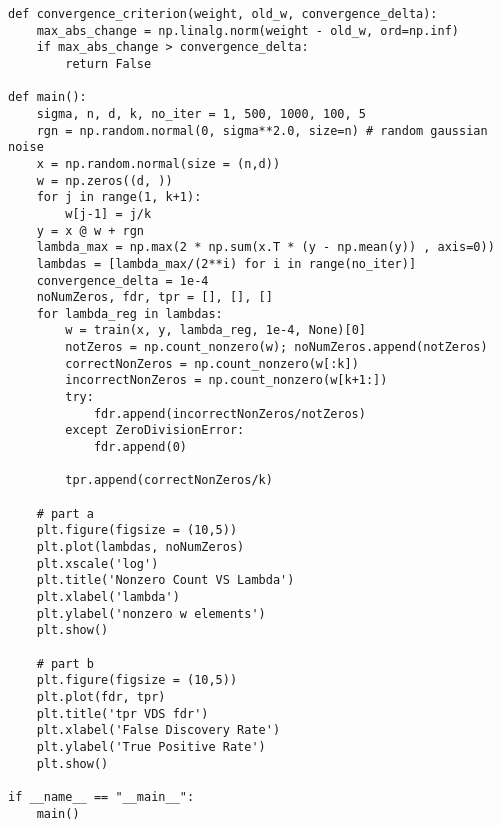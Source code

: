 \documentclass{article}
\begin{document}
\begin{aprob}
\begin{enumerate}
\begin{lstlisting}
def convergence_criterion(weight, old_w, convergence_delta):
    max_abs_change = np.linalg.norm(weight - old_w, ord=np.inf)
    if max_abs_change > convergence_delta:
        return False

def main():
    sigma, n, d, k, no_iter = 1, 500, 1000, 100, 5
    rgn = np.random.normal(0, sigma**2.0, size=n) # random gaussian noise
    x = np.random.normal(size = (n,d))
    w = np.zeros((d, ))
    for j in range(1, k+1): 
        w[j-1] = j/k
    y = x @ w + rgn
    lambda_max = np.max(2 * np.sum(x.T * (y - np.mean(y)) , axis=0))
    lambdas = [lambda_max/(2**i) for i in range(no_iter)]
    convergence_delta = 1e-4
    noNumZeros, fdr, tpr = [], [], []
    for lambda_reg in lambdas:
        w = train(x, y, lambda_reg, 1e-4, None)[0]
        notZeros = np.count_nonzero(w); noNumZeros.append(notZeros)
        correctNonZeros = np.count_nonzero(w[:k])
        incorrectNonZeros = np.count_nonzero(w[k+1:])
        try:
            fdr.append(incorrectNonZeros/notZeros)
        except ZeroDivisionError:
            fdr.append(0)
            
        tpr.append(correctNonZeros/k)

    # part a
    plt.figure(figsize = (10,5))
    plt.plot(lambdas, noNumZeros)
    plt.xscale('log')
    plt.title('Nonzero Count VS Lambda')
    plt.xlabel('lambda')
    plt.ylabel('nonzero w elements')
    plt.show()

    # part b
    plt.figure(figsize = (10,5))
    plt.plot(fdr, tpr)
    plt.title('tpr VDS fdr')
    plt.xlabel('False Discovery Rate')
    plt.ylabel('True Positive Rate')
    plt.show()

if __name__ == "__main__":
    main()
    \end{lstlisting}
  \end{enumerate}
  
  \end{aprob}
  
\end{document}
